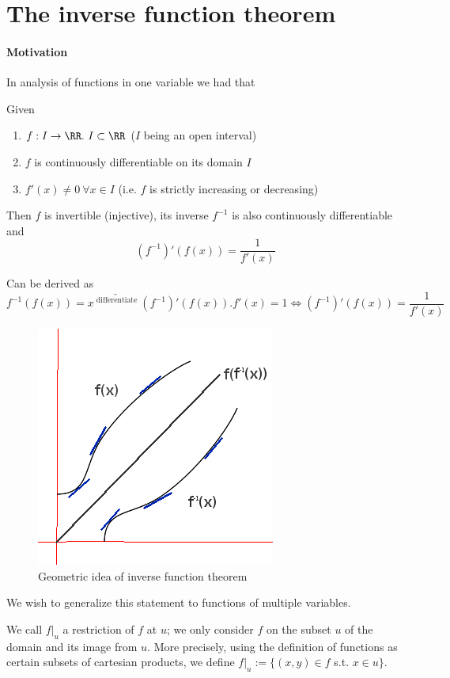 \section[The inverse function theorem]{The inverse function theorem}
\paragraph{Motivation}
In analysis of functions in one variable we had that
\begin{thm}
Given
\begin{enumerate}
  \item $f: I \rightarrow \RR.\ I \subset \RR$ ($I$ being an open interval)
  \item $f$ is continuously differentiable on its domain $I$
  \item $f'(x) \neq 0\  \forall x \in I$ (i.e. $f$ is strictly increasing or decreasing)
\end{enumerate}
Then $f$ is invertible (injective), its inverse $f^{-1}$ is also continuously differentiable and
$$(f^{-1})'(f(x)) = \frac{1}{f'(x)}$$
\end{thm}

\begin{rem}
  Can be derived as $$f^{-1}(f(x)) = x\ \underrightarrow{^\text{differentiate}}\ (f^{-1})'(f(x)).f'(x) = 1 \Leftrightarrow (f^{-1})'(f(x)) = \frac{1}{f'(x)}$$
  \end{rem}

\begin{figure}[ht] %
  \center
  \includegraphics[scale=0.6]{figures/invfuncthm}
  \caption{Geometric idea of inverse function theorem}
\end{figure}

We wish to generalize this statement to functions of multiple variables.
\begin{ldefn}
  We call $f|_u$ a restriction of $f$ at $u$; we only consider $f$ on the subset $u$ of the domain and its image from $u$.
  More precisely, using the definition of functions as certain subsets of cartesian products, we define $f|_u:=\{(x,y)\in f$ s.t. $x\in u\}$.
\end{ldefn}


